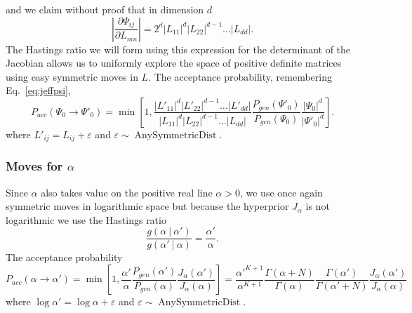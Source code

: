 \documentclass[11pt, oneside]{article}   	%
\begin{document}
and we claim without proof that in dimension $d$
$$\left\vert\frac{\partial\Psi_{ij}}{\partial L_{mn}}\right\vert = 2^d \vert L_{11}\vert^d \vert L_{22}\vert^{d-1}\ldots \vert L_{dd}\vert.$$
The Hastings ratio we will form using this expression for the determinant of the Jacobian allows us to uniformly explore the space of positive definite matrices using easy symmetric moves in $L$. The acceptance probability, remembering Eq.~\ref{eq:jeffpsi},
$$P_{acc}(\Psi_0\rightarrow\Psi'_0) = \min\left[1, \frac{\vert L'_{11}\vert^d \vert L'_{22}\vert^{d-1}\ldots \vert L'_{dd}\vert}{\vert L_{11}\vert^d \vert L_{22}\vert^{d-1}\ldots \vert L_{dd}\vert}\frac{P_{gen}(\Psi'_0)}{P_{gen}(\Psi_0)}\frac{\vert\Psi_0\vert^d}{\vert\Psi'_0\vert^d}\right].$$
where $L'_{ij} = L_{ij} + \varepsilon$ and $\varepsilon\sim\operatorname{AnySymmetricDist}$.

\subsubsection{Moves for $\alpha$}
Since $\alpha$ also takes value on the positive real line $\alpha > 0$, we use once again symmetric moves in logarithmic space but because the hyperprior $J_\alpha$ is not logarithmic we use the Hastings ratio
$$\frac{g(\alpha~\vert~\alpha')}{g(\alpha'~\vert~\alpha)} = \frac{\alpha'}{\alpha}.$$
The acceptance probability
$$P_{acc}(\alpha\rightarrow\alpha') = \min\left[1, \frac{\alpha'}{\alpha}\frac{P_{gen}(\alpha')}{P_{gen}(\alpha)}\frac{J_{\alpha}(\alpha')}{J_\alpha(\alpha)}\right] = \frac{\alpha'^{K+1}}{\alpha^{K+1}}\frac{\Gamma(\alpha + N)}{\Gamma(\alpha)}\frac{\Gamma(\alpha')}{\Gamma(\alpha' + N)}\frac{J_\alpha(\alpha')}{J_\alpha(\alpha)}$$
where $\log\alpha' = \log\alpha + \varepsilon$ and $\varepsilon\sim\operatorname{AnySymmetricDist}$.
\end{document}
